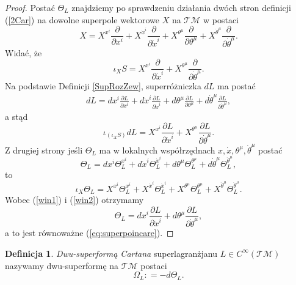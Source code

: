\documentclass[11pt,a4paper]{report}
\theoremstyle{definition}
\newtheorem{definition}[theorem]{Definicja}
\begin{document}
\begin{proof}
	Postać $\Theta_L$ znajdziemy po sprawdzeniu  działania dwóch stron definicji (\ref{2Car}) na dowolne superpole wektorowe $X$ na $\mathcal{TM}$ w postaci
	\begin{equation*}
		X = X^{x^i} \frac{\partial}{\partial x^i} + X^{\dot{x}^i} \frac{\partial}{\partial \dot{x}^i} + X^{\theta^\mu} \frac{\partial}{\partial \theta^\mu} + X^{\dot{\theta}^\mu} \frac{\partial}{\partial \dot{\theta}^\mu}.
	\end{equation*}
	Widać, że
	\begin{equation*}
		\iota_X S = X^{x^i} \frac{\partial}{\partial \dot{x}^i} + X^{\theta^\mu} \frac{\partial}{\partial \dot{\theta}^\mu}.
	\end{equation*}
	Na podstawie Definicji \ref{SupRozZew}, superróżniczka $dL$ ma postać
	\begin{equation*}
		\begin{gathered}
			dL = dx^i \frac{\partial L}{\partial x^i} + d\dot{x}^i \frac{\partial L}{\partial \dot{x}^i} + d\theta^\mu \frac{\partial L}{\partial \theta^\mu } + d\dot{\theta}^\mu \frac{\partial L}{\partial \dot{\theta}^\mu},
		\end{gathered}
	\end{equation*}
	a stąd
	\begin{equation}\label{win1}
		\iota_{(\iota_X S)} dL = X^{x^i} \frac{\partial L}{\partial \dot{x}^i} + X^{\theta^\mu} \frac{\partial L}{\partial \dot{\theta}^\mu}.
	\end{equation}
	Z drugiej strony jeśli $\Theta_L$ ma  w lokalnych wsp\'o\l rz\k ednach $x,\dot x,\theta^\mu,\dot\theta^\mu$ posta\'c $$\Theta_L = dx^i \Theta^{x^i}_L + d \dot x^i \Theta^{\dot{x}^i}_L + d \theta^\mu \Theta^{\theta^\mu}_L + d \dot \theta^\mu \Theta^{\dot{\theta}^\mu}_L,$$ to
	\begin{equation}\label{win2}
		\iota_X \Theta_L = X^{x^i} \Theta^{x^i}_L + X^{\dot x^i} \Theta^{\dot x^i}_L + X^{\theta^\mu} \Theta^{\theta^\mu}_L + X^{\dot \theta^\mu} \Theta^{\dot \theta^\mu}_L\!.
	\end{equation}
	Wobec (\ref{win1}) i (\ref{win2}) otrzymamy $$\Theta_L = dx^i \frac{\partial L}{\partial \dot{x}^i} + d\theta^\mu \frac{\partial L}{\partial \dot{\theta}^\mu},$$ a to jest równoważne (\ref{eq:superpoincare}).
\end{proof}
			      				
\begin{definition}
	\textit{Dwu-superformą Cartana} superlagranżjanu $L\in C^\infty(\mathcal{TM} )$ nazywamy dwu-superformę na $\mathcal{TM}$ postaci
	\begin{equation}
		\Omega_L: = - d \Theta_L.
	\end{equation}
\end{definition}
			      				
\end{document}
